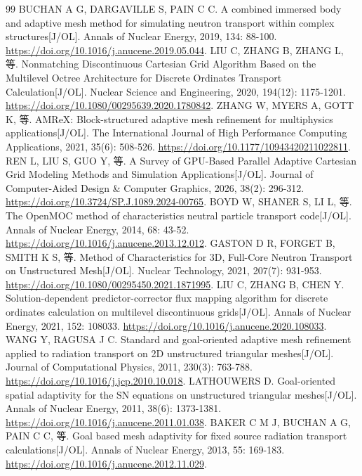 \documentclass[UTF8, zihao=-4, fontset=none, a4paper]{ctexart}
\begin{document}
\begin{thebibliography}{99}
 BUCHAN A G, DARGAVILLE S, PAIN C C. A combined immersed body and adaptive mesh method for simulating neutron transport within complex structures{[}J/OL{]}. Annals of Nuclear Energy, 2019, 134: 88-100. \url{https://doi.org/10.1016/j.anucene.2019.05.044}.
 LIU C, ZHANG B, ZHANG L, 等. Nonmatching Discontinuous Cartesian Grid Algorithm Based on the Multilevel Octree Architecture for Discrete Ordinates Transport Calculation{[}J/OL{]}. Nuclear Science and Engineering, 2020, 194(12): 1175-1201. \url{https://doi.org/10.1080/00295639.2020.1780842}.
 ZHANG W, MYERS A, GOTT K, 等. AMReX: Block-structured adaptive mesh refinement for multiphysics applications{[}J/OL{]}. The International Journal of High Performance Computing Applications, 2021, 35(6): 508-526. \url{https://doi.org/10.1177/10943420211022811}.
 REN L, LIU S, GUO Y, 等. A Survey of GPU-Based Parallel Adaptive Cartesian Grid Modeling Methods and Simulation Applications{[}J/OL{]}. Journal of Computer-Aided Design \& Computer Graphics, 2026, 38(2): 296-312. \url{https://doi.org/10.3724/SP.J.1089.2024-00765}.
 BOYD W, SHANER S, LI L, 等. The OpenMOC method of characteristics neutral particle transport code{[}J/OL{]}. Annals of Nuclear Energy, 2014, 68: 43-52. \url{https://doi.org/10.1016/j.anucene.2013.12.012}.
 GASTON D R, FORGET B, SMITH K S, 等. Method of Characteristics for 3D, Full-Core Neutron Transport on Unstructured Mesh{[}J/OL{]}. Nuclear Technology, 2021, 207(7): 931-953. \url{https://doi.org/10.1080/00295450.2021.1871995}.
 LIU C, ZHANG B, CHEN Y. Solution-dependent predictor-corrector flux mapping algorithm for discrete ordinates calculation on multilevel discontinuous grids{[}J/OL{]}. Annals of Nuclear Energy, 2021, 152: 108033. \url{https://doi.org/10.1016/j.anucene.2020.108033}.
 WANG Y, RAGUSA J C. Standard and goal-oriented adaptive mesh refinement applied to radiation transport on 2D unstructured triangular meshes{[}J/OL{]}. Journal of Computational Physics, 2011, 230(3): 763-788. \url{https://doi.org/10.1016/j.jcp.2010.10.018}.
 LATHOUWERS D. Goal-oriented spatial adaptivity for the SN equations on unstructured triangular meshes{[}J/OL{]}. Annals of Nuclear Energy, 2011, 38(6): 1373-1381. \url{https://doi.org/10.1016/j.anucene.2011.01.038}.
 BAKER C M J, BUCHAN A G, PAIN C C, 等. Goal based mesh adaptivity for fixed source radiation transport calculations{[}J/OL{]}. Annals of Nuclear Energy, 2013, 55: 169-183. \url{https://doi.org/10.1016/j.anucene.2012.11.029}.

\end{thebibliography}
\end{document}
